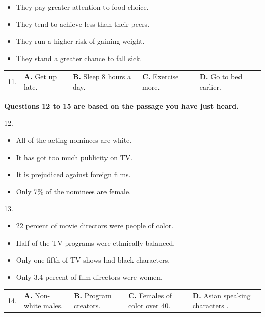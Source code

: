 \documentclass[UTF8,11pt]{ctexart}
\begin{document}
\begin{itemize}[leftmargin=2em,itemsep=.2em,topsep=.4em]\item[A.] They pay greater attention to food choice.
\item[B.] They tend to achieve less than their peers.
\item[C.] They run a higher risk of gaining weight.
\item[D.] They stand a greater chance to fall sick.
\end{itemize}

\noindent\begin{tabularx}{\linewidth}{@{}lXXXX@{}}11. & \textbf{A.} Get up late. & \textbf{B.} Sleep 8 hours a day. & \textbf{C.} Exercise more. & \textbf{D.} Go to bed earlier.\\\end{tabularx}\par

\textbf{Questions 12 to 15 are based on the passage you have just heard.}


12.


\begin{itemize}[leftmargin=2em,itemsep=.2em,topsep=.4em]\item[A.] All of the acting nominees are white.
\item[B.] It has got too much publicity on TV.
\item[C.] It is prejudiced against foreign films.
\item[D.] Only 7\% of the nominees are female.
\end{itemize}

13.


\begin{itemize}[leftmargin=2em,itemsep=.2em,topsep=.4em]\item[A.] 22 percent of movie directors were people of color.
\item[B.] Half of the TV programs were ethnically balanced.
\item[C.] Only one-fifth of TV shows had black characters.
\item[D.] Only 3.4 percent of film directors were women.
\end{itemize}

\noindent\begin{tabularx}{\linewidth}{@{}lXXXX@{}}14. & \textbf{A.} Non-white males. & \textbf{B.} Program creators. & \textbf{C.} Females of color over 40. & \textbf{D.} Asian speaking characters .\\\end{tabularx}\par
\end{document}
